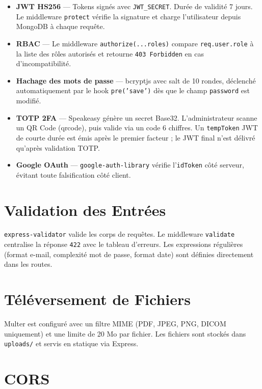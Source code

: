 \documentclass[12pt,a4paper]{report}
\begin{document}
\begin{itemize}[leftmargin=*,itemsep=3pt]
  \item \textbf{JWT HS256} — Tokens signés avec \texttt{JWT\_SECRET}. Durée de validité 7 jours. Le middleware \texttt{protect} vérifie la signature et charge l'utilisateur depuis MongoDB à chaque requête.
  \item \textbf{RBAC} — Le middleware \texttt{authorize(...roles)} compare \texttt{req.user.role} à la liste des rôles autorisés et retourne \texttt{403 Forbidden} en cas d'incompatibilité.
  \item \textbf{Hachage des mots de passe} — bcryptjs avec salt de 10 rondes, déclenché automatiquement par le hook \texttt{pre('save')} dès que le champ \texttt{password} est modifié.
  \item \textbf{TOTP 2FA} — Speakeasy génère un secret Base32. L'administrateur scanne un QR Code (qrcode), puis valide via un code 6 chiffres. Un \texttt{tempToken} JWT de courte durée est émis après le premier facteur ; le JWT final n'est délivré qu'après validation TOTP.
  \item \textbf{Google OAuth} — \texttt{google-auth-library} vérifie l'\texttt{idToken} côté serveur, évitant toute falsification côté client.
\end{itemize}

\section{Validation des Entrées}

\texttt{express-validator} valide les corps de requêtes. Le middleware \texttt{validate} centralise la réponse \texttt{422} avec le tableau d'erreurs. Les expressions régulières (format e-mail, complexité mot de passe, format date) sont définies directement dans les routes.

\section{Téléversement de Fichiers}

Multer est configuré avec un filtre MIME (PDF, JPEG, PNG, DICOM uniquement) et une limite de 20 Mo par fichier. Les fichiers sont stockés dans \texttt{uploads/} et servis en statique via Express.

\section{CORS}
\end{document}
